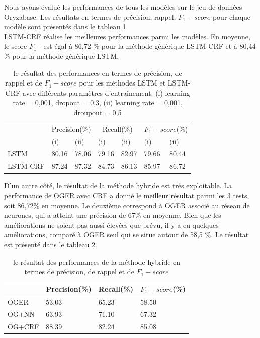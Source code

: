 Nous avons évalué les performances de tous les modèles sur le jeu de données Oryzabase. Les résultats en termes de précision, rappel, $ F_ {1} -score $ pour chaque modèle sont présentés dans le tableau \ref{result1}.\\

LSTM-CRF réalise les meilleures performances parmi les modèles. En moyenne, le score $ F_ {1} $ - est égal à 86,72 \% pour la méthode générique LSTM-CRF et à 80,44 \% pour la méthode générique LSTM.

\begin{center}
\begin{table}[h]
\begin{tabular}{ |p{2.5 cm}| p{1.5 cm}|p{1.5 cm}|p{1.5 cm}|p{1.5 cm}| p{1.5 cm}|p{1.5 cm}|} 
\hline
\multirow{2}{4em}{} & 
\multicolumn{2}{|c|}{Precision(\%)} 
& \multicolumn{2}{|c|}{Recall(\%)}
&\multicolumn{2}{|c|}{$F_{1}-score$(\%)} \\&
(i)&(ii)&(i)&(ii)&(i)&(ii) \\
\hline
LSTM & 80.16& 78.06& 79.16&82.97&79.66 &80.44 \\ 
\hline
LSTM-CRF &87.24&87.32&84.73&86.13&85.97&86.72 \\
\hline
\end{tabular}
\newline
\caption{\label{result1} le résultat des performances en termes de précision, de rappel et de $ F_ {1} -score $ pour les méthodes LSTM et LSTM-CRF avec différents paramètres d’entraînement: (i) learning rate = 0,001, dropout = 0,3, (ii) learning rate = 0,001, droupout = 0,5}
\end{table}
\end{center}

D'un autre côté, le résultat de la méthode hybride est très exploitable. La performance de OGER avec CRF a donné le meilleur résultat parmi les 3 tests, soit 86,72\% en moyenne. Le deuxième correspond à OGER associé au réseau de neurones, qui a atteint une précision de 67\% en moyenne. Bien que les améliorations ne soient pas aussi élevées que prévu, il y a eu quelques améliorations, comparé à OGER seul qui se situe autour de 58,5 \%. Le résultat est présenté dans le tableau \ref{resultat2}.

\begin{center}
\begin{table}[h]
\begin{tabular}{ |p{2.5cm}|p{3 cm}| p{3 cm}|p{3 cm}|} 
\hline
 &Precision(\%)&Recall(\%)&$F_{1}-score$(\%)\\
 \hline
OGER&53.03&65.23&58.50\\ 
\hline
OG+NN& 63.93&71.10 &67.32 \\
\hline
OG+CRF & 88.39&82.24&85.08\\
\hline
\end{tabular}
\newline
\caption{\label{resultat2} le résultat des performances de la méthode hybride en termes de précision, de rappel et de $F_{1}-score$}
\end{table}
\end{center}


